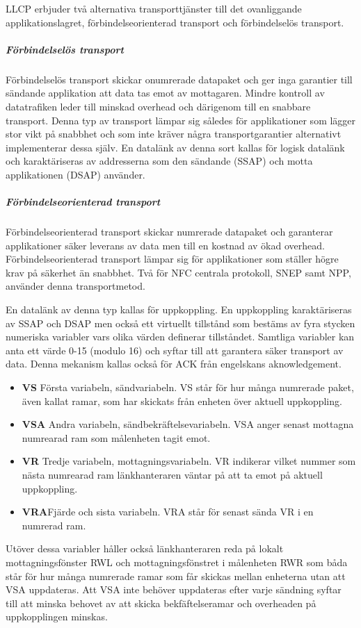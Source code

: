 \documentclass[11pt]{article}
\begin{document}
LLCP erbjuder två alternativa transporttjänster till det ovanliggande applikationslagret, förbindelseorienterad transport och förbindelselös transport.

\subparagraph{Förbindelselös transport}
Förbindelselös transport skickar onumrerade datapaket och ger inga garantier till sändande applikation att data tas emot av mottagaren. Mindre kontroll av datatrafiken leder till minskad overhead och därigenom till en snabbare transport. Denna typ av transport lämpar sig således för applikationer som lägger stor vikt på snabbhet och som inte kräver några transportgarantier alternativt implementerar dessa själv. En datalänk av denna sort kallas för logisk datalänk och karaktäriseras av addresserna som den sändande (SSAP) och motta applikationen (DSAP) använder.

\subparagraph{Förbindelseorienterad transport}
Förbindelseorienterad transport skickar numrerade datapaket och garanterar applikationer säker leverans av data men till en kostnad av ökad overhead. Förbindelseorienterad transport lämpar sig för applikationer som ställer högre krav på säkerhet än snabbhet. Två för NFC centrala protokoll, SNEP samt NPP, använder denna transportmetod.

En datalänk av denna typ kallas för uppkoppling. En uppkoppling karaktäriseras av SSAP och DSAP men också ett virtuellt tillstånd som bestäms av fyra stycken numeriska variabler vars olika värden definerar tillståndet. Samtliga variabler kan anta ett värde 0-15 (modulo 16) och syftar till att garantera säker transport av data. Denna mekanism kallas också för ACK från engelskans aknowledgement.

\begin{itemize}
\item \textbf{VS} Första variabeln, sändvariabeln. VS står för hur många numrerade paket, även kallat ramar, som har skickats från enheten över aktuell uppkoppling.
\item \textbf{VSA} Andra variabeln, sändbekräftelsevariabeln. VSA anger senast mottagna numrearad ram som målenheten tagit emot.
\item \textbf{VR} Tredje variabeln, mottagningsvariabeln. VR indikerar vilket nummer som nästa numrearad ram länkhanteraren väntar på att ta emot på aktuell uppkoppling.
\item \textbf{VRA}Fjärde och sista variabeln. VRA står för senast sända VR i en numrerad ram.
\end{itemize}

Utöver dessa variabler håller också länkhanteraren reda på lokalt mottagningsfönster RWL och mottagningsfönstret i målenheten RWR som båda står för hur många numrerade ramar som får skickas mellan enheterna utan att VSA uppdateras. Att VSA inte behöver uppdateras efter varje sändning syftar till att minska behovet av att skicka bekfäftelseramar och overheaden på uppkopplingen minskas.
\end{document}
